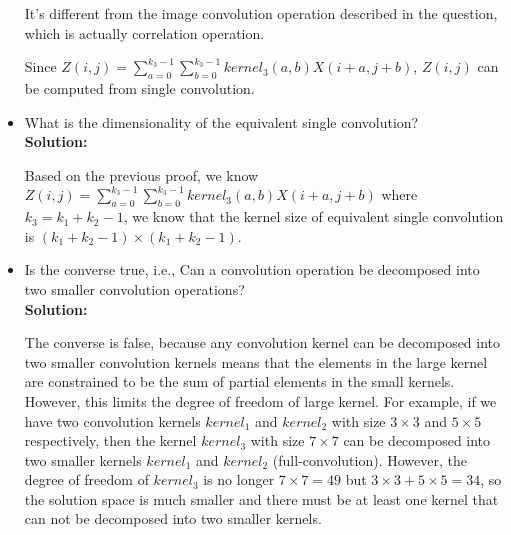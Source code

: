 \documentclass[12pt]{article}%
\begin{document}
\begin{itemize}
        It's different from the image convolution operation described in the question, which is actually correlation operation.
        \par Since $Z(i,j) = \sum_{a=0}^{k_3-1}\sum_{b=0}^{k_3-1}kernel_3(a,b)X(i+a,j+b)$, $Z(i,j)$ can be computed from single convolution.
        \item What is the dimensionality of the equivalent single convolution?\\
        {\bf Solution:}
        \par Based on the previous proof, we know $Z(i,j) = \sum_{a=0}^{k_3-1}\sum_{b=0}^{k_3-1}kernel_3(a,b)X(i+a,j+b)$ where $k_3=k_1+k_2-1$,
        we know that the kernel size of equivalent single convolution is $(k_1+k_2-1)\times (k_1+k_2-1)$.
        \item Is the converse true, i.e.,
        Can a convolution operation be decomposed into two smaller convolution operations?\\
        {\bf Solution:}
        \par The converse is false, because any convolution kernel can be decomposed into two smaller convolution kernels means
        that the elements in the large kernel are constrained to be the sum of partial elements in the small kernels.
        However, this limits the degree of freedom of large kernel.
        For example, if we have two convolution kernels $kernel_1$ and $kernel_2$ with size $3\times 3$ and $5\times 5$ respectively,
        then the kernel $kernel_3$ with size $7\times 7$ can be decomposed into two smaller kernels $kernel_1$ and $kernel_2$ (full-convolution).
        However, the degree of freedom of $kernel_3$ is no longer $7\times 7 = 49$ but $3\times 3+5\times 5 = 34$, so the solution space is much smaller
        and there must be at least one kernel that can not be decomposed into two smaller kernels.
    \end{itemize}

    
    
    
    
    
\end{document}

